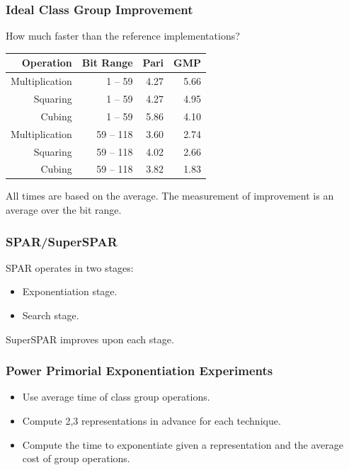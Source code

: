 \documentclass{beamer}
\newcommand{\smallfont}{\fontsize{6pt}{7.2}\selectfont}
\begin{document}
\begin{frame}
\frametitle{Ideal Class Group Improvement}
How much faster than the reference implementations?
\begin{table}
\centering
\begin{tabular}{ | r | r | r | r | }
\hline
Operation & Bit Range & Pari & GMP \\
\hline
Multiplication & 1 -- 59 & 4.27 & 5.66 \\
Squaring & 1 -- 59 & 4.27 & 4.95 \\
Cubing & 1 -- 59 & 5.86 & 4.10 \\
Multiplication & 59 -- 118 & 3.60 & 2.74 \\
Squaring & 59 -- 118 & 4.02 & 2.66 \\
Cubing & 59 -- 118 & 3.82 & 1.83 \\
\hline
\end{tabular}
\end{table}

\bigskip
\smallfont
All times are based on the average.  The measurement of improvement is an average over the bit range.
\end{frame}



\begin{frame}
\frametitle{SPAR/SuperSPAR}
SPAR operates in two stages:
\begin{itemize}
\item Exponentiation stage.
\item Search stage.
\end{itemize}

\bigbreak
SuperSPAR improves upon each stage.
\end{frame}

\begin{frame}
\frametitle{Power Primorial Exponentiation Experiments}
\begin{itemize}
\item Use average time of class group operations.
\item Compute 2,3 representations in advance for each technique.
\item Compute the time to exponentiate given a representation and the average cost of group operations.
\end{itemize}
\end{frame}
\end{document}
